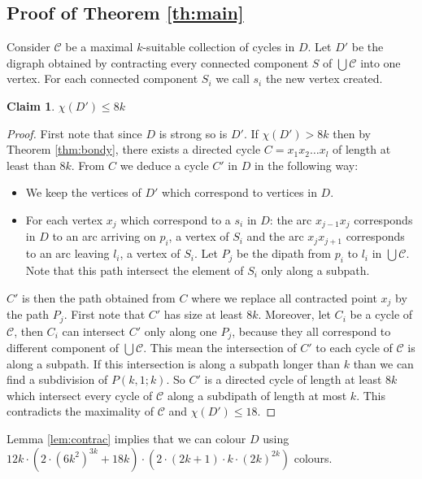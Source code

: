 \documentclass[utf8,10pt]{article}
\theoremstyle{plain}
\newtheorem{claim}{Claim}[theorem]
\theoremstyle{definition}
\theoremstyle{remark}
\newcommand{\dr}{ (2k+1)\cdot k \cdot (2k)^{2k}}
\newcommand{\col}{(6k^2)^{3k}}
\begin{document}
\subsection{Proof of Theorem \ref{th:main}}

Consider $\mathcal{C}$ be a maximal $k$-suitable collection of cycles in $D$. Let $D'$ be the digraph obtained by contracting 
every connected component $S$ of $\bigcup \mathcal{C}$ into one vertex. For each connected component $S_i$ we call $s_i$ the
new vertex created.

\begin{claim}\label{cl:nocycle}
$\chi(D') \leq 8k$
\end{claim} 

\begin{proof}
First note that since $D$ is strong so is $D'$. If $\chi(D') > 8k$ then by Theorem \ref{thm:bondy}, there exists
a directed cycle $C = x_1x_2 \dots x_l$ of length at least than $8k$. From $C$ we deduce a cycle $C'$ in $D$ in the following way: 
\begin{itemize}
	\item We keep the vertices of $D'$ which correspond to vertices in $D$.
	\item For each vertex $x_j$ which correspond to a $s_i$ in $D$: the arc $x_{j-1}x_j$ corresponds in $D$ to an arc arriving on 
		$p_i$, a vertex of $S_i$ and the arc $x_jx_{j+1}$ corresponds to an arc leaving $l_i$, a vertex of $S_i$. Let $P_j$ be the dipath 
		from $p_i$ to $l_i$ in $\bigcup \mathcal{C}$. Note that this path intersect the element of $S_i$ only along a subpath. 
\end{itemize}
$C'$ is then the path obtained from $C$ where we replace all contracted point $x_j$ by the path $P_j$. 
First note that $C'$ has size at least $8k$. Moreover, let $C_i$ be a cycle of $\mathcal{C}$, then $C_i$ can
intersect $C'$ only along one $P_j$, because they all correspond to different component of $\bigcup \mathcal{C}$. This mean the
intersection of $C'$ to each cycle of $\mathcal{C}$ is along a subpath. If this intersection is along a subpath longer than $k$ than we can 
find a subdivision of $P(k,1;k)$. So $C'$ is a directed cycle of length at least $8k$ which intersect every cycle of $\mathcal{C}$ along a 
subdipath of length at most $k$. This contradicts the maximality of $\mathcal{C}$ and $\chi(D') \leq 18$.
\end{proof}


Lemma \ref{lem:contrac} implies that we can colour $D$ using $12k \cdot (2\cdot \col + 18k) \cdot (2 \cdot \dr)$ colours.
\end{document}

